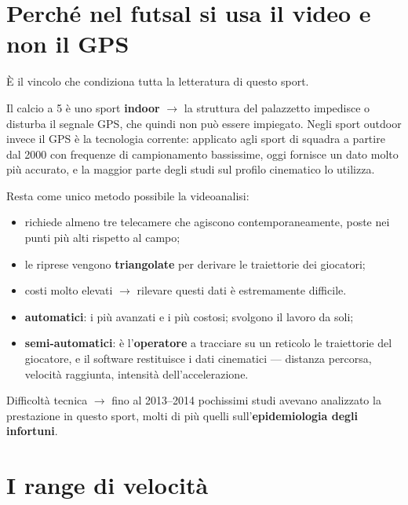 \section{Perché nel futsal si usa il video e non il GPS}

È il vincolo che condiziona tutta la letteratura di questo sport.

Il calcio a 5 è uno sport \textbf{indoor} $\rightarrow$ la struttura del palazzetto impedisce o
disturba il segnale GPS, che quindi non può essere impiegato. Negli sport outdoor invece il GPS è la
tecnologia corrente: applicato agli sport di squadra a partire dal 2000 con frequenze di
campionamento bassissime, oggi fornisce un dato molto più accurato, e la maggior parte degli studi
sul profilo cinematico lo utilizza.

Resta come unico metodo possibile la videoanalisi:
\begin{itemize}
  \item richiede almeno tre telecamere che agiscono contemporaneamente, poste nei punti più alti
    rispetto al campo;
  \item le riprese vengono \textbf{triangolate} per derivare le traiettorie dei giocatori;
  \item costi molto elevati $\rightarrow$ rilevare questi dati è estremamente difficile.
\end{itemize}

\begin{itemize}
  \item \textbf{automatici}: i più avanzati e i più costosi; svolgono il lavoro da soli;
  \item \textbf{semi-automatici}: è l'\textbf{operatore} a tracciare su un reticolo le traiettorie
    del giocatore, e il software restituisce i dati cinematici --- distanza percorsa, velocità
    raggiunta, intensità dell'accelerazione.
\end{itemize}

Difficoltà tecnica $\rightarrow$ fino al 2013--2014 pochissimi studi avevano analizzato la
prestazione in questo sport, molti di più quelli sull'\textbf{epidemiologia degli infortuni}.

\section{I range di velocità}

